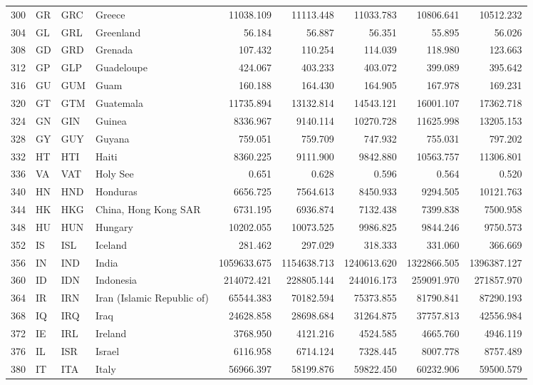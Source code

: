 {\begin{longtable}{rlllrrrrr}
 300 & GR & GRC & Greece & 11038.109 & 11113.448 & 11033.783 & 10806.641 & 10512.232 \\
 304 & GL & GRL & Greenland & 56.184 & 56.887 & 56.351 & 55.895 & 56.026 \\
 308 & GD & GRD & Grenada & 107.432 & 110.254 & 114.039 & 118.980 & 123.663 \\
 312 & GP & GLP & Guadeloupe & 424.067 & 403.233 & 403.072 & 399.089 & 395.642 \\
 316 & GU & GUM & Guam & 160.188 & 164.430 & 164.905 & 167.978 & 169.231 \\
 320 & GT & GTM & Guatemala & 11735.894 & 13132.814 & 14543.121 & 16001.107 & 17362.718 \\
 324 & GN & GIN & Guinea & 8336.967 & 9140.114 & 10270.728 & 11625.998 & 13205.153 \\
 328 & GY & GUY & Guyana & 759.051 & 759.709 & 747.932 & 755.031 & 797.202 \\
 332 & HT & HTI & Haiti & 8360.225 & 9111.900 & 9842.880 & 10563.757 & 11306.801 \\
 336 & VA & VAT & Holy See & 0.651 & 0.628 & 0.596 & 0.564 & 0.520 \\
 340 & HN & HND & Honduras & 6656.725 & 7564.613 & 8450.933 & 9294.505 & 10121.763 \\
 344 & HK & HKG & China, Hong Kong SAR & 6731.195 & 6936.874 & 7132.438 & 7399.838 & 7500.958 \\
 348 & HU & HUN & Hungary & 10202.055 & 10073.525 & 9986.825 & 9844.246 & 9750.573 \\
 352 & IS & ISL & Iceland & 281.462 & 297.029 & 318.333 & 331.060 & 366.669 \\
 356 & IN & IND & India & 1059633.675 & 1154638.713 & 1240613.620 & 1322866.505 & 1396387.127 \\
 360 & ID & IDN & Indonesia & 214072.421 & 228805.144 & 244016.173 & 259091.970 & 271857.970 \\
 364 & IR & IRN & Iran (Islamic Republic of) & 65544.383 & 70182.594 & 75373.855 & 81790.841 & 87290.193 \\
 368 & IQ & IRQ & Iraq & 24628.858 & 28698.684 & 31264.875 & 37757.813 & 42556.984 \\
 372 & IE & IRL & Ireland & 3768.950 & 4121.216 & 4524.585 & 4665.760 & 4946.119 \\
 376 & IL & ISR & Israel & 6116.958 & 6714.124 & 7328.445 & 8007.778 & 8757.489 \\
 380 & IT & ITA & Italy & 56966.397 & 58199.876 & 59822.450 & 60232.906 & 59500.579 \\

\end{longtable}}
